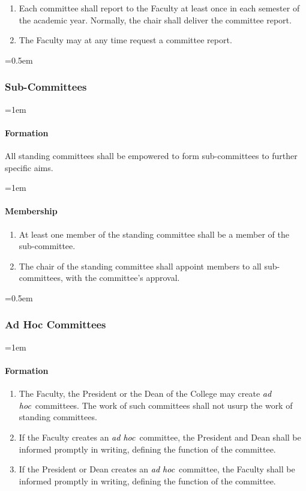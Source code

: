 \documentclass{manual}
\newcommand{\keyword}[1]{\textcolor{black}{#1}}
\newcommand{\adho}{\keyword{\textit{ad hoc}}~}
\let\oldsubsubsection\subsubsection
\renewcommand\subsubsection{\leftskip=0.5em\oldsubsubsection}
\let\oldparagraph\paragraph
\renewcommand\paragraph{\leftskip=1em\oldparagraph}
\newcommand{\itemLevelA}{\alph*.}
\newcommand{\itemRefA}{\alph*}
\begin{document}
	\begin{enumerate}[label=\itemLevelA,ref=\itemRefA]
	\item Each committee shall report to the Faculty at least once in each semester of the academic year. Normally, the chair shall deliver the committee report.
	\item The Faculty may at any time request a committee report. 
	\end{enumerate}

\subsubsection{Sub-Committees}

\paragraph{Formation}
All standing committees shall be empowered to form sub-committees to further specific aims. 

\paragraph{Membership}

	\begin{enumerate}[label=\itemLevelA,ref=\itemRefA]
	\item At least one member of the standing committee shall be a member of the sub-committee.
	\item The chair of the standing committee shall appoint members to all sub-committees, with the committee's approval.
	\end{enumerate}

\subsubsection{Ad Hoc Committees}

\paragraph{Formation}

	\begin{enumerate}[label=\itemLevelA,ref=\itemRefA]
	\item The Faculty, the President or the Dean of the College may create \adho committees. The work of such committees shall not usurp the work of standing committees.
	\item If the Faculty creates an \adho committee, the President and Dean shall be informed promptly in writing, defining the function of the committee.
	\item If the President or Dean creates an \adho committee, the Faculty shall be informed promptly in writing, defining the function of the committee.
	\end{enumerate}
\end{document}
